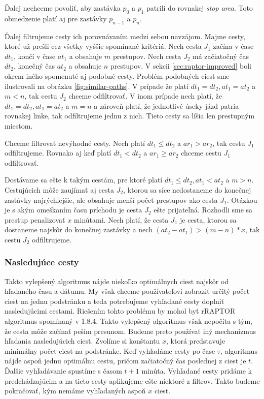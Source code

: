 Ďalej nechceme povoliť, aby zastávka $p_0$ a $p_1$ patrili do rovnakej \textit{stop area}. Toto obmedzenie platí aj pre zastávky $p_{n-1}$ a $p_n$.

Ďalej filtrujeme cesty ich porovnávaním medzi sebou navzájom. Majme cesty, ktoré už prešli cez všetky vyššie spomínané kritériá. Nech cesta $J_1$ začína v čase $dt_1$, končí v čase $at_1$ a obsahuje $m$ prestupov. Nech cesta $J_2$ má začiatočný čas $dt_2$, konečný čas $at_2$ a obsahuje $n$ prestupov. V sekcii \ref{sec:raptor-improved} boli okrem iného spomenuté aj podobné cesty. Problém podobných ciest sme ilustrovali na obrázku \ref{fig:similar-paths}. V prípade že platí $dt_1 = dt_2, at_1=at_2$ a $m < n$, tak cestu $J_2$ chceme odfiltrovať. V inom prípade nech platí, že $dt_1 = dt_2, at_1=at_2$ a $m=n$ a zároveň platí, že jednotlivé úseky jázd patria rovnakej linke, tak odfiltrujeme jednu z nich. Tieto cesty sa líšia len prestupným miestom. 

Chceme filtrovať nevýhodné cesty. Nech platí $dt_1 \leq dt_2$ a $ar_1 > ar_2$, tak cestu $J_1$ odfiltrujeme. Rovnako aj keď platí $dt_1 < dt_2$ a $ar_1 \geq ar_2$ chceme cestu $J_1$ odfiltrovať. 

Dostávame sa ešte k takým cestám, pre ktoré platí $dt_1 \leq dt_2, at_1<at_2$ a $m>n$. Cestujúcich môže zaujímať aj cesta $J_2$, ktorou sa síce nedostaneme do konečnej zastávky najrýchlejšie, ale obsahuje menší počet prestupov ako cesta $J_1$. Otázkou je s akým omeškaním času príchodu je cesta $J_2$ ešte prijateľná. Rozhodli sme sa prestup penalizovať $x$ minútami. Nech platí, že cesta $J_1$ je cesta, ktorou sa dostaneme najskôr do konečnej zastávky a nech $(at_2-at_1) > (m-n) * x$, tak cestu $J_2$ odfiltrujeme.

\subsubsection{Nasledujúce cesty}
Takto vylepšený algoritmus nájde niekoľko optimálnych ciest najskôr od hľadaného času a dátumu. My však chceme používateľovi zobraziť určitý počet ciest na jednu podstránku a teda potrebujeme vyhľadané cesty doplniť nasledujúcimi cestami. 
Riešením tohto problému by mohol byť rRAPTOR algoritmus spomínaný v 1.8.4. Takto vylepšený algoritmus však nepočíta s tým, že cesta môže začínať peším presunom. Budeme preto používať iný mechanizmus hľadania nasledujúcich ciest.
Zvolíme si konštantu $x$, ktorá predstavuje minimálny počet ciest na podstránke. Keď vyhľadáme cesty po čase $\tau$, algoritmus nájde aspoň jednu optimálnu cestu, pričom začiatočný čas poslednej z ciest je $t$. Ďalšie vyhľadávanie spustíme s časom $t + 1$ minúta. Vyhľadané cesty pridáme k predchádzajúcim a na tieto cesty aplikujeme ešte niektoré z filtrov. Takto budeme pokračovať, kým nemáme vyhľadaných aspoň $x$ ciest.

